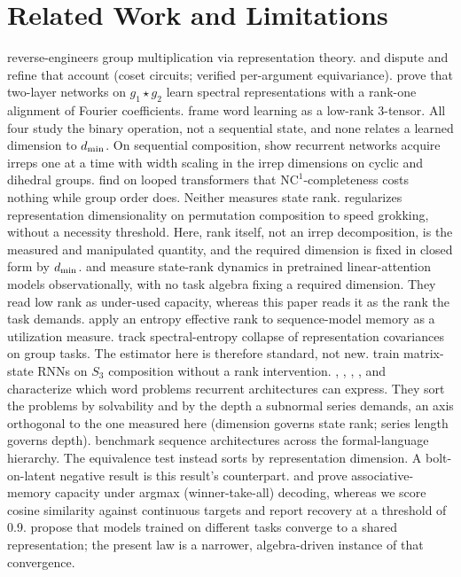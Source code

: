 \section{Related Work and Limitations}
\label{sec:related}

\citet{chughtai2023universality} reverse-engineers group multiplication via
representation theory. \citet{stander2024cosets} and \citet{wu2025unified}
dispute and refine that account (coset circuits; verified per-argument
equivariance). \citet{he2026spectral} prove that two-layer networks on
$g_1 \star g_2$ learn spectral representations with a rank-one alignment of
Fourier coefficients. \citet{shutman2025words} frame word learning as a
low-rank 3-tensor. All four study the binary operation, not a sequential state,
and none relates a learned dimension to $d_{\min}$. On sequential composition,
\citet{marchetti2026sequential} show recurrent networks acquire irreps one at a
time with width scaling in the irrep dimensions on cyclic and dihedral groups.
\citet{zhang2026recurrence} find on looped transformers that
$\mathrm{NC}^1$-completeness costs nothing while group order does. Neither
measures state rank. \citet{kazanskii2026grokking} regularizes
representation dimensionality on permutation composition to speed
grokking, without a necessity threshold. Here, rank itself, not an irrep
decomposition, is the measured and manipulated quantity, and the
required dimension is fixed in closed form by $d_{\min}$.
\citet{nazari2026rank} and \citet{sun2026staterank} measure
state-rank dynamics in pretrained linear-attention models observationally,
with no task algebra fixing a required dimension. They read low rank as
under-used capacity, whereas this paper reads it as the rank the task demands.
\citet{parnichkun2025ess} apply an entropy effective rank to sequence-model
memory as a utilization measure. \citet{truong2026spectral} track
spectral-entropy collapse of representation covariances on group tasks. The
estimator here is therefore standard, not new.
\citet{mishra2026m2rnn} train matrix-state RNNs on $S_3$ composition
without a rank intervention. \citet{grazzi2025negative},
\citet{siems2025deltaproduct}, \citet{merrill2024illusion},
\citet{shakerinava2026diagonal}, and \citet{nowak2026algebraic}
characterize which word problems recurrent architectures can express. They
sort the problems by solvability and by the depth a subnormal series demands,
an axis orthogonal to the one measured here (dimension governs state rank;
series length governs depth). \citet{deletang2023chomsky} benchmark sequence
architectures across the formal-language hierarchy. The equivalence test
instead sorts by representation dimension. A bolt-on-latent negative result
\citep{larson2026gradient} is this result's counterpart.
\citet{nichani2025factual} and \citet{barnfield2026sharp} prove
associative-memory capacity under argmax (winner-take-all) decoding,
whereas we score cosine similarity against continuous targets and report
recovery at a threshold of 0.9.
\citet{huh2024platonic} propose that models trained on different tasks
converge to a shared representation; the present law is a narrower,
algebra-driven instance of that convergence.
